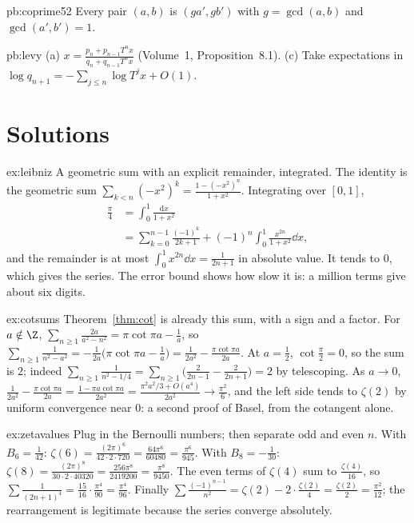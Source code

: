 \begin{hint}{pb:coprime52}
Every pair $(a,b)$ is $(ga',gb')$ with $g=\gcd(a,b)$ and $\gcd(a',b')=1$.
\end{hint}

\begin{hint}{pb:levy}
(a) $x=\frac{p_n+p_{n-1}T^nx}{q_n+q_{n-1}T^nx}$ (Volume~1, Proposition~8.1). (c) Take expectations in $\log q_{n+1}=-\sum_{j\le n}\log T^jx+O(1)$.
\end{hint}

\section{Solutions}

\begin{solution}{ex:leibniz}
\idea A geometric sum with an explicit remainder, integrated.
\writeup The identity is the geometric sum $\sum_{k<n}(-x^2)^k=\frac{1-(-x^2)^n}{1+x^2}$. Integrating over $[0,1]$,
\[
\begin{aligned}\frac\pi4&=\int_0^1\frac{\mathrm dx}{1+x^2}\\&=\sum_{k=0}^{n-1}\frac{(-1)^k}{2k+1}+(-1)^n\int_0^1\frac{x^{2n}}{1+x^2}\dd x,\end{aligned}
\]
and the remainder is at most $\int_0^1x^{2n}\dd x=\frac1{2n+1}$ in absolute value. It tends to $0$, which gives the series. The
error bound shows how slow it is: a million terms give about six digits.
\end{solution}

\begin{solution}{ex:cotsums}
\idea Theorem~\ref{thm:cot} is already this sum, with a sign and a factor.
\writeup For $a\notin\Z$, $\sum_{n\ge1}\frac{2a}{a^2-n^2}=\pi\cot\pi a-\frac1a$, so
$\sum_{n\ge1}\frac1{n^2-a^2}=-\frac1{2a}\bigl(\pi\cot\pi a-\frac1a\bigr)=\frac1{2a^2}-\frac{\pi\cot\pi a}{2a}$. At $a=\frac12$, $\cot\frac\pi2=0$, so the sum is
$2$; indeed $\sum_{n\ge1}\frac1{n^2-1/4}=\sum_{n\ge1}\bigl(\frac2{2n-1}-\frac2{2n+1}\bigr)=2$ by telescoping. As $a\to0$,
$\frac1{2a^2}-\frac{\pi\cot\pi a}{2a}=\frac{1-\pi a\cot\pi a}{2a^2}=\frac{\pi^2a^2/3+O(a^4)}{2a^2}\to\frac{\pi^2}6$, and the left side tends to
$\zeta(2)$ by uniform convergence near $0$: a second proof of Basel, from the cotangent alone.
\end{solution}

\begin{solution}{ex:zetavalues}
\idea Plug in the Bernoulli numbers; then separate odd and even $n$.
\writeup With $B_6=\frac1{42}$: $\zeta(6)=\frac{(2\pi)^6}{42\cdot2\cdot720}=\frac{64\pi^6}{60480}=\frac{\pi^6}{945}$. With $B_8=-\frac1{30}$:
$\zeta(8)=\frac{(2\pi)^8}{30\cdot2\cdot40320}=\frac{256\pi^8}{2419200}=\frac{\pi^8}{9450}$. The even terms of $\zeta(4)$ sum to $\frac{\zeta(4)}{16}$, so
$\sum\frac1{(2n+1)^4}=\frac{15}{16}\cdot\frac{\pi^4}{90}=\frac{\pi^4}{96}$. Finally $\sum\frac{(-1)^{n-1}}{n^2}=\zeta(2)-2\cdot\frac{\zeta(2)}4=\frac{\zeta(2)}2=\frac{\pi^2}{12}$;
the rearrangement is legitimate because the series converge absolutely.
\end{solution}

